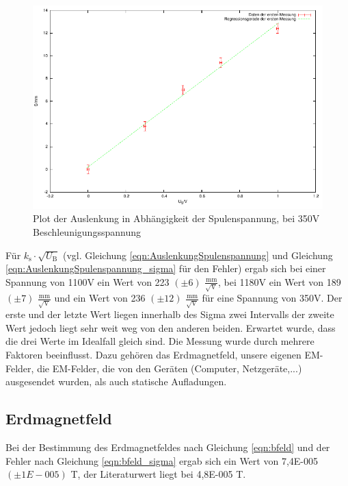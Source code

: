 \documentclass[12pt]{scrartcl}
\begin{document}
\begin{figure}[htbp] 
  \centering
    \includegraphics[scale = 1]{b_3.pdf}
  	\caption[Plot der Auslenkung in Abhängigkeit der Spulenspannung, bei 350V Beschleunigungsspannung]{Plot der Auslenkung in Abhängigkeit der Spulenspannung, bei 350V Beschleunigungsspannung}
  \label{fig:x_1}
\end{figure}

Für $k_\text{s} \cdot \sqrt{U_\text{B}}$ (vgl. Gleichung \ref{eqn:AuslenkungSpulenspannung} und Gleichung \ref{eqn:AuslenkungSpulenspannung_sigma} für den Fehler)  ergab sich bei einer Spannung von 1100V ein Wert von 223 $(\pm 6)$ $\frac{\text{mm}}{\sqrt{\text{V}}}$, bei 1180V ein Wert von 189 $(\pm 7)$ $\frac{\text{mm}}{\sqrt{\text{V}}}$ und ein Wert von 236 $(\pm 12)$ $\frac{\text{mm}}{\sqrt{\text{V}}}$ für eine Spannung von 350V. Der erste und der letzte Wert liegen innerhalb des Sigma zwei Intervalls der zweite Wert jedoch liegt sehr weit weg von den anderen beiden. Erwartet wurde, dass die drei Werte im Idealfall gleich sind.
Die Messung wurde durch mehrere Faktoren beeinflusst. Dazu gehören das Erdmagnetfeld, unsere eigenen EM-Felder, die EM-Felder, die von den Geräten (Computer, Netzgeräte,...) ausgesendet wurden, als auch statische Aufladungen.

\subsection{Erdmagnetfeld}
Bei der Bestimmung des Erdmagnetfeldes nach Gleichung \ref{eqn:bfeld} und der Fehler nach Gleichung \ref{eqn:bfeld_sigma} ergab sich ein Wert von 7,4E-005 $(\pm 1E-005)$ T, der Literaturwert liegt bei 4,8E-005 T.
\end{document}
